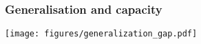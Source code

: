 \documentclass[notes]{beamer}          %
\newif\iffull
\begin{document}
\begin{frame}
\frametitle{Generalisation and capacity}
    \begin{center}
        \texttt{[image: figures/generalization\_gap.pdf]}
    \end{center}
\end{frame}

\begin{comment}

\begin{frame}
\frametitle{Training set size}
    \begin{itemize}
        \item Training and generalisation error vary as the size of the training data set varies.
        \item Expected generalisation error never increases as the size of the training set increases.
        \iffull
        \item Any fixed parametric model will asymptotically approach an error value that exceeds the so called Bayes error.
        \fi
        \item It is possible for the model to have optimal capacity and still have a large gap between training and generalisation errors.
        \item In that case the gap usually can be reduced with increasing the number of training examples.
    \end{itemize}
\end{frame}


\begin{frame}
\frametitle{Training set size}
    \begin{center}
        \texttt{[image: figures/training\_set\_size.png]}
    \end{center}
    \tiny{Figure source: deeplearningbook.org}
\end{frame}

\end{comment}
\end{document}
